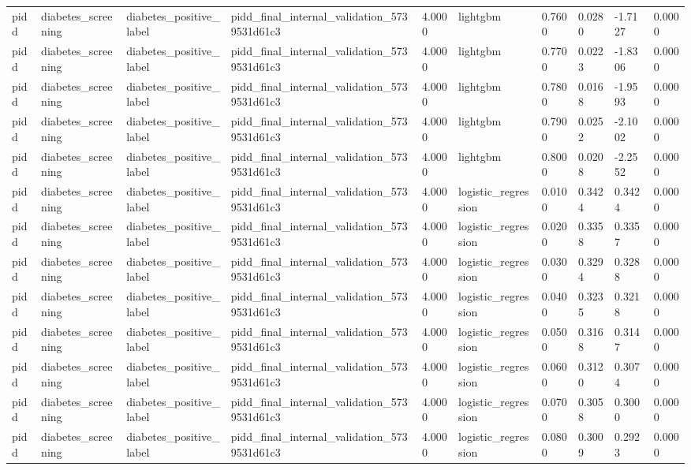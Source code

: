 \begin{tabular}{llllllllll}
pidd & diabetes\_screening & diabetes\_positive\_label & pidd\_final\_internal\_validation\_5739531d61c3 & 4.0000 & lightgbm & 0.7600 & 0.0280 & -1.7127 & 0.0000 \\
pidd & diabetes\_screening & diabetes\_positive\_label & pidd\_final\_internal\_validation\_5739531d61c3 & 4.0000 & lightgbm & 0.7700 & 0.0223 & -1.8306 & 0.0000 \\
pidd & diabetes\_screening & diabetes\_positive\_label & pidd\_final\_internal\_validation\_5739531d61c3 & 4.0000 & lightgbm & 0.7800 & 0.0168 & -1.9593 & 0.0000 \\
pidd & diabetes\_screening & diabetes\_positive\_label & pidd\_final\_internal\_validation\_5739531d61c3 & 4.0000 & lightgbm & 0.7900 & 0.0252 & -2.1002 & 0.0000 \\
pidd & diabetes\_screening & diabetes\_positive\_label & pidd\_final\_internal\_validation\_5739531d61c3 & 4.0000 & lightgbm & 0.8000 & 0.0208 & -2.2552 & 0.0000 \\
pidd & diabetes\_screening & diabetes\_positive\_label & pidd\_final\_internal\_validation\_5739531d61c3 & 4.0000 & logistic\_regression & 0.0100 & 0.3424 & 0.3424 & 0.0000 \\
pidd & diabetes\_screening & diabetes\_positive\_label & pidd\_final\_internal\_validation\_5739531d61c3 & 4.0000 & logistic\_regression & 0.0200 & 0.3358 & 0.3357 & 0.0000 \\
pidd & diabetes\_screening & diabetes\_positive\_label & pidd\_final\_internal\_validation\_5739531d61c3 & 4.0000 & logistic\_regression & 0.0300 & 0.3294 & 0.3288 & 0.0000 \\
pidd & diabetes\_screening & diabetes\_positive\_label & pidd\_final\_internal\_validation\_5739531d61c3 & 4.0000 & logistic\_regression & 0.0400 & 0.3235 & 0.3218 & 0.0000 \\
pidd & diabetes\_screening & diabetes\_positive\_label & pidd\_final\_internal\_validation\_5739531d61c3 & 4.0000 & logistic\_regression & 0.0500 & 0.3168 & 0.3147 & 0.0000 \\
pidd & diabetes\_screening & diabetes\_positive\_label & pidd\_final\_internal\_validation\_5739531d61c3 & 4.0000 & logistic\_regression & 0.0600 & 0.3120 & 0.3074 & 0.0000 \\
pidd & diabetes\_screening & diabetes\_positive\_label & pidd\_final\_internal\_validation\_5739531d61c3 & 4.0000 & logistic\_regression & 0.0700 & 0.3058 & 0.3000 & 0.0000 \\
pidd & diabetes\_screening & diabetes\_positive\_label & pidd\_final\_internal\_validation\_5739531d61c3 & 4.0000 & logistic\_regression & 0.0800 & 0.3009 & 0.2923 & 0.0000 \\

\end{tabular}
